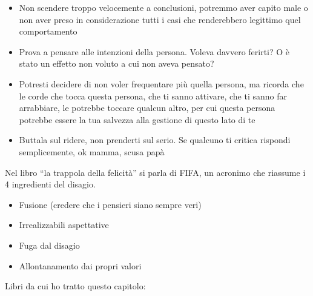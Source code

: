 \documentclass[12pt]{book} %
\begin{document}
\begin{itemize}
\item Non scendere troppo velocemente a conclusioni, potremmo aver capito male o non aver preso in considerazione tutti
i casi che renderebbero legittimo quel comportamento
\item Prova a pensare alle intenzioni della persona. Voleva davvero ferirti? O è stato un effetto non voluto a cui non
aveva pensato?
\item Potresti decidere di non voler frequentare più quella persona, ma ricorda che le corde che tocca questa persona,
che ti sanno attivare, che ti sanno far arrabbiare, le potrebbe toccare qualcun altro, per cui questa persona potrebbe
essere la tua salvezza alla gestione di questo lato di te
\item Buttala sul ridere, non prenderti sul serio. Se qualcuno ti critica rispondi semplicemente, ok mamma, scusa papà
\end{itemize}

\bigskip

Nel libro “la trappola della felicità” si parla di FIFA, un acronimo che riassume i 4 ingredienti del disagio.

\begin{itemize}
\item Fusione (credere che i pensieri siano sempre veri)
\item Irrealizzabili aspettative 
\item Fuga dal disagio 
\item Allontanamento dai propri valori
\end{itemize}

\bigskip

Libri da cui ho tratto questo capitolo:
\end{document}
